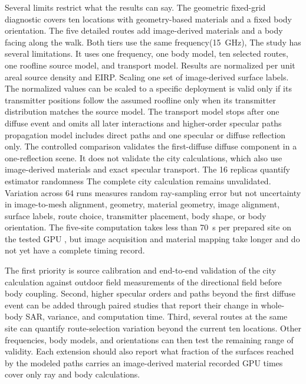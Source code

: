 \documentclass{IEEEoj} %
\providecommand{\DIFadd}[1]{{\protect\color{blue} \sf #1}} %
\providecommand{\DIFdel}[1]{{\protect\color{red} \scriptsize #1}} %
\providecommand{\DIFaddbegin}{} %
\providecommand{\DIFaddend}{} %
\providecommand{\DIFdelbegin}{} %
\providecommand{\DIFdelend}{} %
\begin{document}
\DIFdelbegin \DIFdel{Several limits restrict what the results can say. The geometric fixed-grid
diagnostic covers ten locations with geometry-based materials and a fixed body
orientation. The five detailed routes add image-derived materials and a body
facing along the walk. Both tiers use the same frequency(15~GHz), }\DIFdelend \DIFaddbegin \DIFadd{The study has several limitations. It uses one frequency, one body model, ten
selected routes, one roofline }\DIFaddend source model, and \DIFdelbegin \DIFdel{transport model. Results are normalized per unit areal source density and
EIRP. Scaling }\DIFdelend \DIFaddbegin \DIFadd{one set of image-derived surface
labels. The normalized values can be scaled }\DIFaddend to a specific deployment \DIFdelbegin \DIFdel{is valid only if its transmitter positions follow the assumed roofline }\DIFdelend \DIFaddbegin \DIFadd{only when
its transmitter distribution matches the source }\DIFaddend model. The \DIFdelbegin \DIFdel{transport model
stops after one
diffuse event and omits all later interactions and higher-order specular paths}\DIFdelend \DIFaddbegin \DIFadd{propagation model
includes direct paths and one specular or diffuse reflection only}\DIFaddend . The
controlled comparison validates the \DIFdelbegin \DIFdel{first-diffuse }\DIFdelend \DIFaddbegin \DIFadd{diffuse }\DIFaddend component in a one-reflection
scene. \DIFdelbegin \DIFdel{It does not validate the city calculations, which also
use image-derived materials and exact specular transport. The 16 replicas
quantify estimator randomness }\DIFdelend \DIFaddbegin \DIFadd{The complete city calculation remains unvalidated. Variation across 64 runs measures
random ray-sampling error }\DIFaddend but not uncertainty in \DIFdelbegin \DIFdel{image-to-mesh alignment,
geometry, material }\DIFdelend \DIFaddbegin \DIFadd{geometry, image alignment,
surface }\DIFaddend labels, route choice, transmitter placement, body shape, or body
orientation. The \DIFdelbegin \DIFdel{five-site computation takes less than 70~s per prepared
site on the tested GPU , but image acquisition and material mapping take longer
and do not yet have a complete timing record.
}%

\DIFdel{The first priority is source calibration and end-to-end validation of the city
calculation against outdoor field measurements of the directional field before
body coupling. Second, higher specular orders and paths beyond the first diffuse
event can be added through paired studies that report their change in whole-body
SAR, variance, and computation time. Third, several routes at the same site can
quantify route-selection variation beyond the current ten locations. Other
frequencies, body models, and orientations can then test the remaining range of
validity. Each extension should also report what fraction of the surfaces
reached by the modeled paths carries an image-derived material}\DIFdelend \DIFaddbegin \DIFadd{recorded GPU times cover only ray and body calculations}\DIFaddend .
\end{document}
